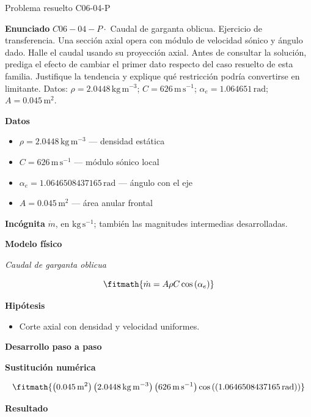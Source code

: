 \documentclass[10pt,openany]{book}
\begin{document}
\begin{studiumworked}{Problema resuelto C06-04-P}


\noindent\textbf{Enunciado}
\(C06-04-P \cdot\) Caudal de garganta oblicua. Ejercicio de transferencia. Una sección axial opera con módulo de velocidad sónico y ángulo dado. Halle el caudal usando su proyección axial. Antes de consultar la solución, prediga el efecto de cambiar el primer dato respecto del caso resuelto de esta familia. Justifique la tendencia y explique qué restricción podría convertirse en limitante. Datos: \(\rho=2.0448\, \mathrm{kg}\,\mathrm{m}^{-3}\); \(C=626\, \mathrm{m}\,\mathrm{s}^{-1}\); \(\alpha_e=1.064651\, \mathrm{rad}\); \(A=0.045\, \mathrm{m}^{2}\).

\noindent\textbf{Datos}
\begin{itemize}
\item $\rho = 2.0448\,\mathrm{kg}\,\mathrm{m}^{-3}$ — densidad estática
\item $C = 626\,\mathrm{m}\,\mathrm{s}^{-1}$ — módulo sónico local
\item $\alpha_e = 1.0646508437165\,\mathrm{rad}$ — ángulo con el eje
\item $A = 0.045\,\mathrm{m}^{2}$ — área anular frontal
\end{itemize}

\noindent\textbf{Incógnita}
$\dot{m}$, en $\mathrm{kg\,s^{-1}}$; también las magnitudes intermedias desarrolladas.

\noindent\textbf{Modelo físico}

\noindent\textit{Caudal de garganta oblicua}

\[
\fitmath{\dot m=A \rho C \cos{\left(\alpha_e \right)}}
\]

\noindent\textbf{Hipótesis}
\begin{itemize}
\item Corte axial con densidad y velocidad uniformes.
\end{itemize}

\noindent\textbf{Desarrollo paso a paso}



\noindent\textbf{Sustitución numérica}

\[
\fitmath{\left(0.045\,\mathrm{m}^{2}\right) \left(2.0448\,\mathrm{kg}\,\mathrm{m}^{-3}\right) \left(626\,\mathrm{m}\,\mathrm{s}^{-1}\right) \cos{\left(\left(1.0646508437165\,\mathrm{rad}\right) \right)}}
\]

\noindent\textbf{Resultado}


\end{studiumworked}
\end{document}
